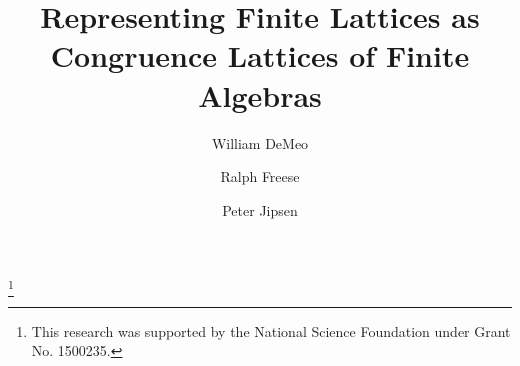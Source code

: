    \newcommand{\todo}[1]{\ifthenelse{\boolean{todos}}{%
       \vskip2mm{\bf TODO:} #1\vskip2mm}{}}






\title[Representing Finite Lattices]{Representing Finite Lattices as \\Congruence
  Lattices of Finite Algebras} 


\author[W. DeMeo]{William DeMeo}
\address{Department of Mathematics\\Iowa State University\\Ames 50010\\USA}
\author[R. Freese]{Ralph Freese}
\address{Department of Mathematics\\University of Hawaii\\Honolulu 96822\\USA}
\author[P. Jipsen]{Peter Jipsen}
\address{School of Computational Sciences\\Chapman University\\Orange 92866\\USA}

\thanks{This research was supported by the National Science 
Foundation under Grant No. 1500235.
}

